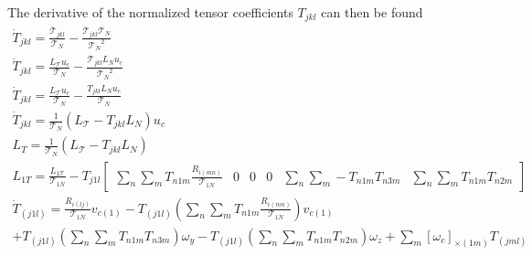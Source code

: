 The derivative of the normalized tensor coefficients $T_{jkl}$ can then be found
\begin{equation}
  \begin{gathered}
    \dot{T}_{jkl} = \frac{\dot{\mathcal{T}}_{jkl}}{\mathcal{T}_{N}} - \frac{\mathcal{T}_{jkl} \dot{\mathcal{T}_{N}}}{{\mathcal{T}_{N}}^{2}}\\
    \dot{T}_{jkl} = \frac{L_{\mathcal{T}} u_c}{\mathcal{T}_{N}} - \frac{\mathcal{T}_{jkl} L_{N} u_c}{{\mathcal{T}_{N}}^{2}}\\
    \dot{T}_{jkl} = \frac{L_{\mathcal{T}} u_c}{\mathcal{T}_{N}} - \frac{T_{jkl} L_{N} u_c}{{\mathcal{T}_{N}}}\\
    \dot{T}_{jkl} = \frac{1}{\mathcal{T}_{N}} (L_{\mathcal{T}} - T_{jkl} L_{N}) u_c\\
    L_{T} = \frac{1}{\mathcal{T}_{N}} (L_{\mathcal{T}} - T_{jkl} L_{N})\\
  L_{1T} = \frac{L_{1\mathcal{T}}}{\mathcal{T}_{1N}} - T_{j1l} \begin{bmatrix}\sum_n \sum_m T_{n1m}\frac{R_{i(mn)}}{\mathcal{T}_{1N}}& 0 & 0 & 0 & \sum_n \sum_m -T_{n1m}T_{n3m}& \sum_n \sum_m T_{n1m}T_{n2m}\end{bmatrix}\\
    \dot{T}_{(j1l)} = \frac{R_{i(lj)}}{\mathcal{T}_{1N}}v_{c(1)} -T_{(j1l)}(\sum_n \sum_m T_{n1m}\frac{R_{i(mn)}}{\mathcal{T}_{1N}} ) v_{c(1)}\\ + T_{(j1l)}(\sum_n \sum_m T_{n1m}T_{n3m})\omega_y - T_{(j1l)}(\sum_n \sum_m T_{n1m}T_{n2m})\omega_z +\sum_{m} {[\omega_{c}]}_{\times(1m)} T_{(jml)}
  \end{gathered}\label{eq:tensornormalizationk1}
\end{equation}

